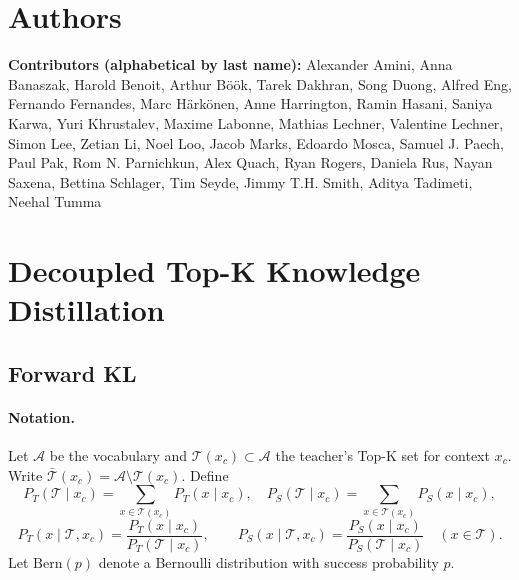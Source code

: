 \documentclass{article}
\begin{document}
\section{Authors}
\label{sec:contributors}
\textbf{Contributors (alphabetical by last name):}
Alexander Amini, Anna Banaszak, Harold Benoit, Arthur B\"o\"ok, Tarek Dakhran, Song Duong, Alfred Eng, Fernando Fernandes, Marc H\"ark\"onen, Anne Harrington, Ramin Hasani, Saniya Karwa, Yuri Khrustalev, Maxime Labonne, Mathias Lechner, Valentine Lechner, Simon Lee, Zetian Li, Noel Loo, Jacob Marks, Edoardo Mosca, Samuel J. Paech, Paul Pak, Rom N. Parnichkun, Alex Quach, Ryan Rogers, Daniela Rus, Nayan Saxena, Bettina Schlager, Tim Seyde, Jimmy T.H. Smith, Aditya Tadimeti, Neehal Tumma




\newpage
\appendix




\section{Decoupled Top-K Knowledge Distillation}
\label{app:dtk}

\subsection{Forward KL}

\paragraph{Notation.}
Let \(\mathcal A\) be the vocabulary and \(\mathcal T(x_c)\subset\mathcal A\) the teacher’s Top-K set for context \(x_c\). Write \(\bar{\mathcal T}(x_c)=\mathcal A\setminus \mathcal T(x_c)\). Define
\[
P_T(\mathcal T\mid x_c)=\sum_{x\in\mathcal T(x_c)} P_T(x\mid x_c),\quad
P_S(\mathcal T\mid x_c)=\sum_{x\in\mathcal T(x_c)} P_S(x\mid x_c),
\]
\[
P_T(x\mid \mathcal T,x_c)=\frac{P_T(x\mid x_c)}{P_T(\mathcal T\mid x_c)},\qquad
P_S(x\mid \mathcal T,x_c)=\frac{P_S(x\mid x_c)}{P_S(\mathcal T\mid x_c)}\quad (x\in\mathcal T).
\]
Let \(\mathrm{Bern}(p)\) denote a Bernoulli distribution with success probability \(p\).
\end{document}
